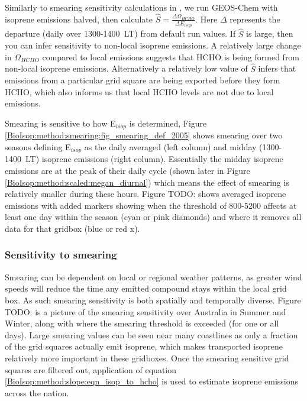       
      Similarly to smearing sensitivity calculations in \textcite{Marais2012}, we run GEOS-Chem with isoprene emissions halved, then calculate $\hat{S} = \frac{\Delta \Omega_{HCHO}}{\Delta E_{isop}} $.
      Here $\Delta$ represents the departure (daily over 1300-1400~LT) from default run values.
      If $\hat{S}$ is large, then you can infer sensitivity to non-local isoprene emissions.
      A relatively large change in $\Omega_{HCHO}$ compared to local emissions suggests that HCHO is being formed from non-local isoprene emissions.
      Alternatively a relatively low value of $\hat{S}$ infers that emissions from a particular grid square are being exported before they form HCHO, which also informs us that local HCHO levels are not due to local emissions.
      
      Smearing is sensitive to how E$_{isop}$ is determined, Figure \ref{BioIsop:method:smearing:fig_smearing_def_2005} shows smearing over two seasons defining E$_{isop}$ as the daily averaged (left column) and midday (1300-1400~LT) isoprene emissions (right column). 
      Essentially the midday isoprene emissions are at the peak of their daily cycle (shown later in Figure \ref{BioIsop:method:scaled:megan_diurnal}) which means the effect of smearing is relatively smaller during these hours.
      Figure TODO: shows averaged isoprene emissions with added markers showing when the threshold of 800-5200 affects at least one day within the season (cyan or pink diamonds) and where it removes all data for that gridbox (blue or red x).
      
      
      
      

    \subsubsection{Sensitivity to smearing}
    
      Smearing can be dependent on local or regional weather patterns, as greater wind speeds will reduce the time any emitted compound stays within the local grid box.
      As such smearing sensitivity is both spatially and temporally diverse.
      Figure TODO: is a picture of the smearing sensitivity over Australia in Summer and Winter, along with where the smearing threshold is exceeded (for one or all days).
      Large smearing values can be seen near many coastlines as only a fraction of the grid squares actually emit isoprene, which makes transported isoprene relatively more important in these gridboxes.
      Once the smearing sensitive grid squares are filtered out, application of equation \ref{BioIsop:method:slope:eqn_isop_to_hcho} is used to estimate isoprene emissions across the nation.
      
